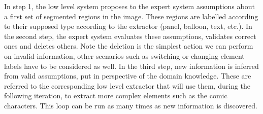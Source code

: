 
In step 1, the low level system proposes to the expert system assumptions about a first set of segmented regions in the image.
These regions are labelled according to their supposed type according to the extractor (panel, balloon, text, etc.).
In the second step, the expert system evaluates these assumptions, validates correct ones and deletes others.
Note the deletion is the simplest action we can perform on invalid information, other scenarios such as switching or changing element labels have to be considered as well.
In the third step, new information is inferred from valid assumptions, put in perspective of the domain knowledge.
These are referred to the corresponding low level extractor that will use them, during the following iteration, to extract more complex elements such as the comic characters.
This loop can be run as many times as new information is discovered.






